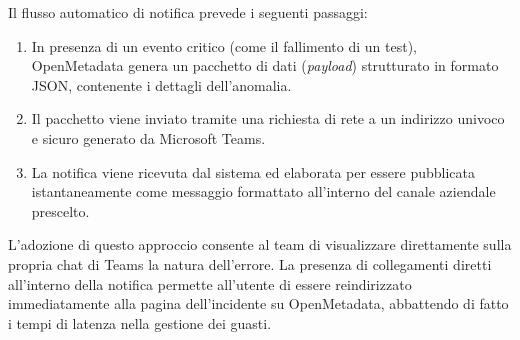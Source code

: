 Il flusso automatico di notifica prevede i seguenti passaggi:
\begin{enumerate}
    \item In presenza di un evento critico (come il fallimento di un test), OpenMetadata genera un pacchetto di dati (\emph{payload}) strutturato in formato JSON, contenente i dettagli dell'anomalia.
    \item Il pacchetto viene inviato tramite una richiesta di rete a un indirizzo univoco e sicuro generato da Microsoft Teams.
    \item La notifica viene ricevuta dal sistema ed elaborata per essere pubblicata istantaneamente come messaggio formattato all'interno del canale aziendale prescelto.
\end{enumerate}

L'adozione di questo approccio consente al team di visualizzare direttamente sulla propria chat di Teams la natura dell'errore. La presenza di collegamenti diretti 
all'interno della notifica permette all'utente di essere reindirizzato immediatamente alla pagina dell'incidente su OpenMetadata, abbattendo di fatto i tempi di 
latenza nella gestione dei guasti.